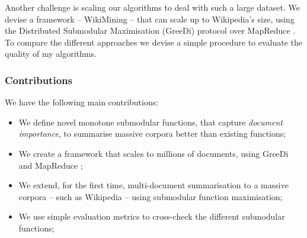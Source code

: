 Another challenge is scaling our algorithms to deal with such a large dataset.
We devise a framework -- WikiMining -- that can scale up to Wikipedia’s size,
using the Distributed Submodular Maximisation (GreeDi) protocol
\cite{mirzasoleiman2013distributed} over MapReduce \cite{dean2008mapreduce}. To
compare the different approaches we devise a simple procedure to evaluate the
quality of my algorithms.

\subsubsection{Contributions}

We have the following main contributions:
\begin{itemize}
  \item We define novel monotone submodular functions, that capture
  \emph{document importance}, to summarise massive corpora better than existing
  functions;
  \item We create a framework that scales to millions of documents, using
  GreeDi \cite{mirzasoleiman2013distributed} and MapReduce
  \cite{dean2008mapreduce};
  \item We extend, for the first time, multi-document summarisation to a
  massive corpora -- such as Wikipedia -- using submodular function
  maximisation;
  \item We use simple evaluation metrics to cross-check the different
  submodular functions;
\end{itemize}

